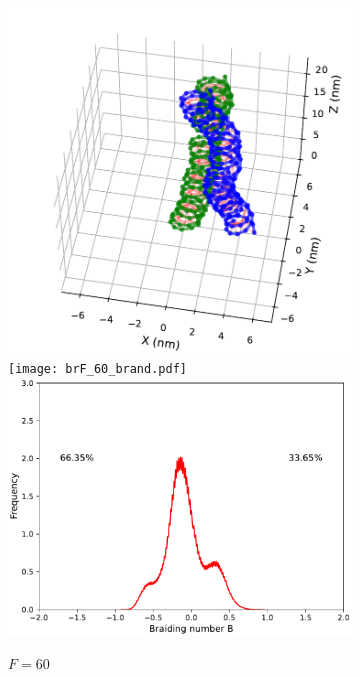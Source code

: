 \documentclass[a4paper,10pt]{article}
\begin{document}
\begin{figure}[htbp]
\begin{subfigure}{.3\textwidth}
\includegraphics[width=\textwidth]{brF_60_2000000.pdf}
\texttt{[image: brF\_60\_brand.pdf]}
\includegraphics[width=\textwidth]{brF_60_br_pr.pdf}
\caption{$F=$\SI{60}{\pico\neuton}}
\label{fig:braF_b}
\end{subfigure}
\begin{subfigure}{.3\textwidth}

\end{subfigure}
\end{figure}
\end{document}
